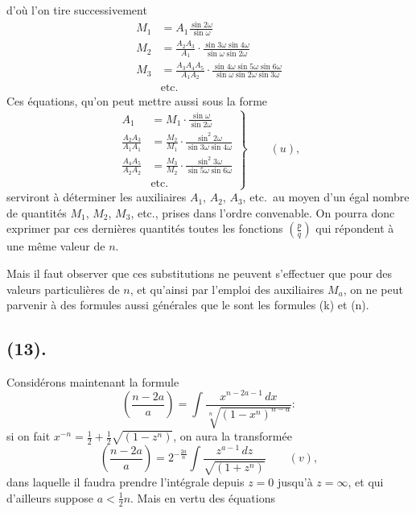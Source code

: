 \documentclass{article}
\begin{document}
d'où l'on tire successivement
\[ \begin{aligned} M_{1}&=A_{1}\frac{\sin 2\omega}{\sin\omega}\\ M_{2}&=\frac{A_{2}A_{3}}{A_{1}}\cdot\frac{\sin 3\omega\sin 4\omega}{\sin\omega\sin 2\omega}\\ M_{3}&=\frac{A_{3}A_{4}A_{5}}{A_{1}A_{2}}\cdot\frac{\sin 4\omega\sin 5\omega\sin 6\omega}{\sin\omega\sin 2\omega\sin 3\omega}\\ &\text{etc.} \end{aligned} \]
Ces équations, qu'on peut mettre aussi sous la forme
\[ \left.\begin{aligned} A_{1}&=M_{1}\cdot\frac{\sin\omega}{\sin 2\omega}\\ \frac{A_{2}A_{3}}{A_{1}A_{1}}&=\frac{M_{2}}{M_{1}}\cdot\frac{\sin^{2}2\omega}{\sin 3\omega\sin 4\omega}\\ \frac{A_{4}A_{5}}{A_{2}A_{2}}&=\frac{M_{3}}{M_{2}}\cdot\frac{\sin^{2}3\omega}{\sin 5\omega\sin 6\omega}\\ &\text{etc.} \end{aligned}\right\}\qquad(u), \]
serviront à déterminer les auxiliaires $A_{1}$, $A_{2}$, $A_{3}$, etc.\ au moyen d'un égal nombre de quantités $M_{1}$, $M_{2}$, $M_{3}$, etc., prises dans l'ordre convenable. On pourra donc exprimer par ces dernières quantités toutes les fonctions $\left(\frac{p}{q}\right)$ qui répondent à une même valeur de $n$.

Mais il faut observer que ces substitutions ne peuvent s'effectuer que pour des valeurs particulières de $n$, et qu'ainsi par l'emploi des auxiliaires $M_{a}$, on ne peut parvenir à des formules aussi générales que le sont les formules (k) et (n).

\subsection*{(13).}

Considérons maintenant la formule
\[ \left(\frac{n-2a}{a}\right)=\int\frac{x^{n-2a-1}\,dx}{\sqrt[n]{(1-x^{n})^{n-a}}}: \]
si on fait $x^{-n}=\frac{1}{2}+\frac{1}{2}\sqrt{(1-z^{n})}$, on aura la transformée
\[ \left(\frac{n-2a}{a}\right)=2^{-\frac{2a}{n}}\int\frac{z^{a-1}\,dz}{\sqrt{(1+z^{n})}}\qquad(v), \]
dans laquelle il faudra prendre l'intégrale depuis $z=0$ jusqu'à $z=\infty$, et qui d'ailleurs suppose $a<\frac{1}{2}n$. Mais en vertu des équations
\end{document}
